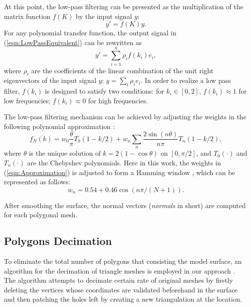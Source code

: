 At this point, the low-pass filtering can be presented as the multiplication of the matrix function $f(K)$ by the input signal $y$:
\begin{equation}
\label{eqn:LowPassEquivalent}
y' = f(K) y.
\end{equation}
For any polynomial transfer function, the output signal in (\ref{eqn:LowPassEquivalent}) can be rewritten as
\begin{equation}
\label{eqn:LowPassPolynomial}
y' = \sum_{i=1}^{n} \rho_i f(k_i) e_i,
\end{equation}
where $\rho_i$ are the coefficients of the linear combination of the unit right eigenvectors of the input signal $y$: $y = \sum_{i} \rho_i e_i$.
In order to realize a low pass filter, $f(k_i)$ is designed to satisfy two conditions: for $k_i \in [0,2]$, $f(k_i) \approx 1$ for low frequencies; $f(k_i) \approx 0$ for high frequencies. %

The low-pass filtering mechanism can be achieved by adjusting the weights in the following polynomial approximation \cite{Taubin1996}:
\begin{equation}
\label{eqn:Approximation}
f_{N}(k) = w_0 \frac{\theta}{\pi} T_0 (1 - k / 2) + w_n \sum_{n} \frac{2 \sin (n \theta)}{n \pi} T_n(1 - k / 2),
\end{equation}
where $\theta$ is the unique solution of $k = 2 (1 - \cos \theta)$ on $[0, \pi / 2]$, and $T_0(\cdot)$ and $T_n(\cdot)$ are the Chebyshev polynomials.
Here in this work, the weights in (\ref{eqn:Approximation}) is adjusted to form a Hamming window \cite{Taubin1996}, which can be represented as follows:
\begin{equation}
\label{eqn:HammingWindow}
w_n = 0.54 + 0.46 \cos (n \pi / (N + 1) ).
\end{equation}

After smoothing the surface, the normal vectors (\emph{normals} in short) are computed for each polygonal mesh.

\subsection{Polygons Decimation}
\label{subsec:decimation}

To eliminate the total number of polygons that consisting the model surface, an algorithm for the decimation of triangle meshes is employed in our approach \cite{Schroeder1992}.
The algorithm attempts to decimate certain rate of original meshes by firstly deleting the vertices whose coordinates are validated beforehand in the surface and then patching the holes left by creating a new triangulation at the location. %

